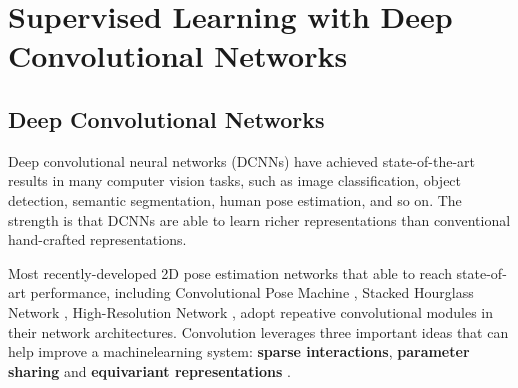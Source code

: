 \section{Supervised Learning with Deep Convolutional Networks} 
    \subsection{Deep Convolutional Networks}
    Deep convolutional neural networks (DCNNs) have achieved state-of-the-art results in many computer
    vision tasks, such as image classification, object detection, semantic segmentation, human pose estimation, and so on. The strength is that DCNNs are able to learn richer representations than conventional hand-crafted representations.
   
    Most recently-developed 2D pose estimation networks that able to reach state-of-art performance, including Convolutional Pose Machine \cite{wei2016cpm}, Stacked Hourglass Network \cite{Newell2016StackedHN}, High-Resolution Network \cite{SunXLW19hrnet}, adopt repeative convolutional modules in their network architectures. Convolution leverages three important ideas that can help improve a machinelearning system: \textbf{sparse interactions}, \textbf{parameter sharing} and \textbf{equivariant representations} \cite{Goodfellow-et-al-2016}.
    
